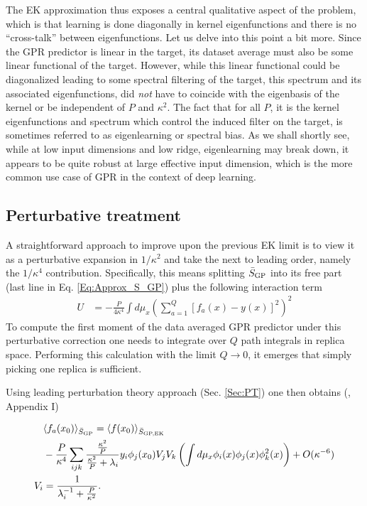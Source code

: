 The EK approximation thus exposes a central qualitative aspect of the problem, which is that learning is done diagonally in kernel eigenfunctions and there is no ``cross-talk'' between eigenfunctions. Let us delve into this point a bit more. Since the GPR predictor is linear in the target, its dataset average must also be some linear functional of the target. However, while this linear functional could be diagonalized leading to some spectral filtering of the target, this spectrum and its associated eigenfunctions, did {\it not} have to coincide with the eigenbasis of the kernel or be independent of $P$ and $\kappa^2$. The fact that for all $P$, it is the kernel eigenfunctions and spectrum which control the induced filter on the target, is sometimes referred to as eigenlearning \citep{simon2021} or spectral bias.
As we shall shortly see, while at low input dimensions and low ridge, eigenlearning may break down, it appears to be quite robust at large effective input dimension, which is the more common use case of GPR in the context of deep learning.   


\subsection{Perturbative treatment}
A straightforward approach to improve upon the previous EK limit is to view it as a perturbative expansion in $1/\kappa^2$ and take the next to leading order, namely the $1/\kappa^4$ contribution. Specifically, this means splitting $\bar{S}_{\text{GP}}$  into its free part (last line in Eq. \ref{Eq:Approx_S_GP}) plus the following interaction term 
\begin{align}
U &= -\frac{P}{4 \kappa^4} \int d\mu_x \left(\sum_{a=1}^Q [f_a(x)-y(x)]^2\right)^2
\end{align}
To compute the first moment of the data averaged GPR predictor under this perturbative correction one needs to integrate over $Q$ path integrals in replica space. Performing this calculation with the limit $Q\to 0$, it emerges that simply picking one replica is sufficient. 

Using leading perturbation theory approach (Sec. \ref{Sec:PT}) one then obtains (\cite{cohen2021learning}, Appendix I)

\begin{align}
&\langle f_a(x_0) \rangle_{\bar{S}_{\text{GP}}}= \langle f(x_0) \rangle_{\bar{S}_{\text{GP,EK}}} \\ \nonumber &
-\frac{P}{\kappa^4} \sum_{ijk}  \frac{\frac{\kappa^2}{P}}{\frac{\kappa^2}{P} + \lambda_i} y_i \phi_j(x_0) V_{j} V_k\left(\int d\mu_x \phi_i(x)\phi_j(x)\phi^2_k(x)\right) + O(\kappa^{-6}) \\ \nonumber 
V_i &= \frac{1}{\lambda_i^{-1} + \frac{P}{\kappa^2}}.
\end{align}

